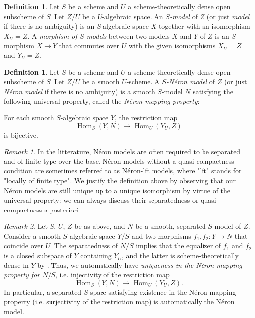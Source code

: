 \documentclass[a4paper,10pt,twoside]{article}
\newcommand{\ra}{\rightarrow}
\DeclareMathOperator{\Hom}{Hom}
\theoremstyle{definition}
\newtheorem{defi}[thm]{Definition}
\theoremstyle{remark}
\newtheorem{rem}{Remark}[thm]
\begin{document}
\begin{defi}
	Let $S$ be a scheme and $U$ a scheme-theoretically dense open subscheme of $S$. Let $Z/U$ be a $U$-algebraic space. An \textit{$S$-model} of $Z$ (or just \textit{model} if there is no ambiguity) is an $S$-algebraic space $X$ together with an isomorphism $X_U=Z$. A \textit{morphism of $S$-models} between two models $X$ and $Y$ of $Z$ is an $S$-morphism $X\ra Y$ that commutes over $U$ with the given isomorphisms $X_U=Z$ and $Y_U=Z$.
\end{defi}

\begin{defi}\label{definition:neron_models}
	Let $S$ be a scheme and $U$ a scheme-theoretically dense open subscheme of $S$. Let $Z/U$ be a smooth $U$-scheme. A \textit{$S$-Néron model} of $Z$ (or just \textit{Néron model} if there is no ambiguity) is a smooth $S$-model $N$ satisfying the following universal property, called the \textit{Néron mapping property}:
	
For each smooth $S$-algebraic space $Y$, the restriction map \[
\Hom_S(Y,N)\ra\Hom_U(Y_U,Z)
\]
is bijective.
\end{defi}

\begin{rem}
In the litterature, N\'eron models are often required to be separated and of finite type over the base. Néron models without a quasi-compactness condition are sometimes referred to as N\'eron-lft models, where "lft" stands for "locally of finite type". We justify the definition above by observing that our Néron models are still unique up to a unique isomorphism by virtue of the universal property: we can always discuss their separatedness or quasi-compactness a posteriori.
\end{rem}

\begin{rem}
	Let $S$, $U$, $Z$ be as above, and $N$ be a smooth, separated $S$-model of $Z$. Consider a smooth $S$-algebraic space $Y/S$ and two morphisms $f_1,f_2\colon Y\ra N$ that coincide over $U$. The separatedness of $N/S$ implies that the equalizer of $f_1$ and $f_2$ is a closed subspace of $Y$ containing $Y_U$, and the latter is scheme-theoretically dense in $Y$ by \cite[Théorème 11.10.5]{EGA4.3}. Thus, we automatically have \emph{uniqueness in the N\'eron mapping property for $N/S$}, i.e. injectivity of the restriction map
	\[
	\Hom_S(Y,N) \to \Hom_U(Y_U,Z).
	\]
In particular, a separated $S$-space satisfying existence in the N\'eron mapping property (i.e. surjectivity of the restriction map) is automatically the Néron model.
\end{rem}
\end{document}
